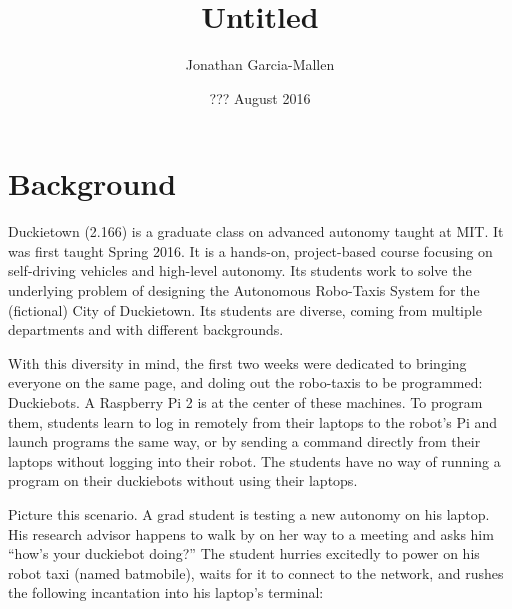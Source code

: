 \documentclass[titlepage]{article}
\title{Untitled}
\author{Jonathan Garcia-Mallen}
\date{??? August 2016}
\begin{document}
\lstset{language=Bash,
  numbers=left,
  stepnumber=3,    
  firstnumber=1,
  numberfirstline=true
}
\maketitle
\tableofcontents

\pagebreak

\section{Background } 
Duckietown (2.166) is a graduate class on advanced autonomy taught at MIT. It was first taught Spring 2016. It is a hands-on, project-based course focusing on self-driving vehicles and high-level autonomy. Its students work to solve the underlying problem of designing the Autonomous Robo-Taxis System for the (fictional) City of Duckietown. Its students are diverse, coming from multiple departments and with different backgrounds. 

With this diversity in mind, the first two weeks were dedicated to bringing everyone on the same page, and doling out the robo-taxis to be programmed: Duckiebots. 
A Raspberry Pi 2 
is at the center of these machines. To program them, students learn to log in remotely from their laptops to the robot's Pi and launch programs the same way, or by sending a command directly from their laptops without logging into their robot. The students have no way of running a program on their duckiebots without using their laptops.

Picture this scenario. A grad student is testing a new autonomy on his laptop. His research advisor happens to walk by on her way to a meeting and asks him ``how's your duckiebot doing?'' The student hurries excitedly to power on his robot taxi (named batmobile), waits for it to connect to the network, and rushes the following incantation into his laptop's terminal:
\end{document}
